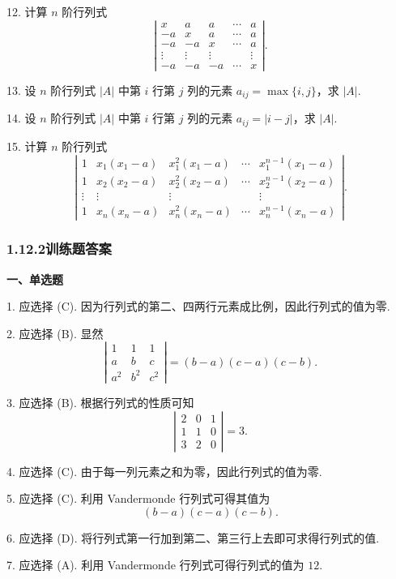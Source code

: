 \documentclass[UTF8,12pt,a4paper,fontset=fandol]{ctexart}
\begin{document}
12. 计算 $n$ 阶行列式
\[
\left|\begin{array}{ccccc}
x&a&a&\cdots&a\\
-a&x&a&\cdots&a\\
-a&-a&x&\cdots&a\\
\vdots&\vdots&\vdots&&\vdots\\
-a&-a&-a&\cdots&x
\end{array}\right|.
\]

13. 设 $n$ 阶行列式 $|A|$ 中第 $i$ 行第 $j$ 列的元素 $a_{ij}=\max\{i,j\}$，求 $|A|$.

14. 设 $n$ 阶行列式 $|A|$ 中第 $i$ 行第 $j$ 列的元素 $a_{ij}=|i-j|$，求 $|A|$.

15. 计算 $n$ 阶行列式
\[
\left|\begin{array}{ccccc}
1&x_1(x_1-a)&x_1^2(x_1-a)&\cdots&x_1^{n-1}(x_1-a)\\
1&x_2(x_2-a)&x_2^2(x_2-a)&\cdots&x_2^{n-1}(x_2-a)\\
\vdots&\vdots&\vdots&&\vdots\\
1&x_n(x_n-a)&x_n^2(x_n-a)&\cdots&x_n^{n-1}(x_n-a)
\end{array}\right|.
\]

\subsubsection*{1.12.2\quad 训练题答案}

\noindent\textbf{一、单选题}

1. 应选择 (C). 因为行列式的第二、四两行元素成比例，因此行列式的值为零.

2. 应选择 (B). 显然
\[
\left|\begin{array}{ccc}
1&1&1\\
a&b&c\\
a^2&b^2&c^2
\end{array}\right|=(b-a)(c-a)(c-b).
\]

3. 应选择 (B). 根据行列式的性质可知
\[
\left|\begin{array}{ccc}
2&0&1\\
1&1&0\\
3&2&0
\end{array}\right|=3.
\]

4. 应选择 (C). 由于每一列元素之和为零，因此行列式的值为零.

5. 应选择 (C). 利用 Vandermonde 行列式可得其值为
\[
(b-a)(c-a)(c-b).
\]

6. 应选择 (D). 将行列式第一行加到第二、第三行上去即可求得行列式的值.

7. 应选择 (A). 利用 Vandermonde 行列式可得行列式的值为 $12$.
\end{document}
